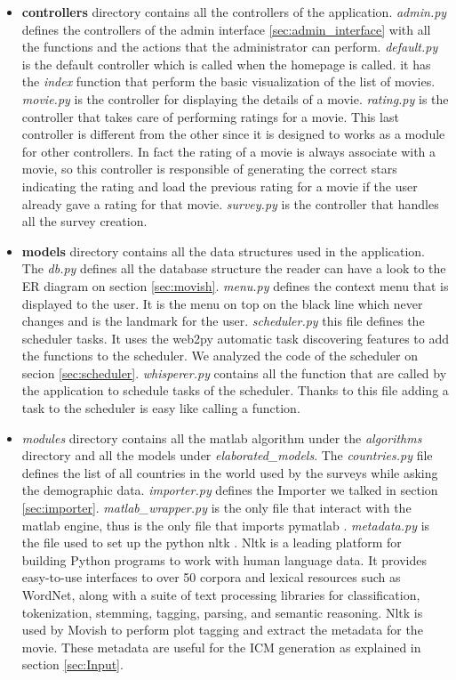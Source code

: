 \begin{itemize}
\item \textbf{controllers} directory contains all the controllers of the application. \textit{admin.py} defines the controllers of the admin interface \ref{sec:admin_interface} with all the functions and the actions that the administrator can perform. \textit{default.py} is the default controller which is called when the homepage is called. it has the \textit{index} function that perform the basic visualization of the list of movies. \textit{movie.py} is the controller for displaying the details of a movie. \textit{rating.py} is the controller that takes care of performing ratings for a movie. This last controller is different from the other since it is designed to works as a module for other controllers. In fact the rating of a movie is always associate with a movie, so this controller is responsible of generating the correct stars indicating the rating and load the previous rating for a movie if the user already gave a rating for that movie. \textit{survey.py} is the controller that handles all the survey creation.
\item \textbf{models} directory contains all the data structures used in the application. The \textit{db.py} defines all the database structure the reader can have a look to the ER diagram on section \ref{sec:movish}. \textit{menu.py} defines the context menu that is displayed to the user. It is the menu on top on the black line which never changes and is the landmark for the user. \textit{scheduler.py} this file defines the scheduler tasks. It uses the web2py automatic task discovering features to add the functions to the scheduler. We analyzed the code of the scheduler on secion \ref{sec:scheduler}. \textit{whisperer.py} contains all the function that are called by the application to schedule tasks of the scheduler. Thanks to this file adding a task to the scheduler is easy like calling a function.
\item \textit{modules} directory contains all the matlab algorithm under the  \textit{algorithms} directory and all the models under \textit{elaborated\_models}. The \textit{countries.py} file defines the list of all countries in the world used by the surveys while asking the demographic data. \textit{importer.py} defines the Importer we talked in section \ref{sec:importer}. \textit{matlab\_wrapper.py} is the only file that interact with the matlab engine, thus is the only file that imports pymatlab \cite{pymatlab}. \textit{metadata.py} is the file used to set up the python \ac{nltk} \cite{nltk}. Nltk is a leading platform for building Python programs to work with human language data. It provides easy-to-use interfaces to over 50 corpora and lexical resources such as WordNet, along with a suite of text processing libraries for classification, tokenization, stemming, tagging, parsing, and semantic reasoning. Nltk is used by Movish to perform plot tagging and extract the metadata for the movie. These metadata are useful for the \ac{ICM} generation as explained in section \ref{sec:Input}.

\end{itemize}

